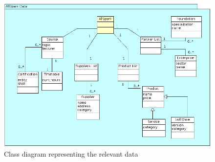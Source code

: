 \begin{figure}
\centering
\includegraphics[scale=0.70,angle=90]{argouml_diags/imgs/data}
\caption{Class diagram representing the relevant data}
\label{img:data1}
\end{figure}

